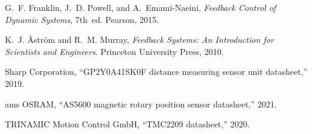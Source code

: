 G.~F. Franklin, J.~D. Powell, and A.~Emami-Naeini, \emph{Feedback Control of Dynamic Systems}, 7th~ed. Pearson, 2015.

K.~J. {\AA}str{\"o}m and R.~M. Murray, \emph{Feedback Systems: An Introduction for Scientists and Engineers}. Princeton University Press, 2010.

Sharp Corporation, ``GP2Y0A41SK0F distance measuring sensor unit datasheet,'' 2019.

ams OSRAM, ``AS5600 magnetic rotary position sensor datasheet,'' 2021.

TRINAMIC Motion Control GmbH, ``TMC2209 datasheet,'' 2020.
